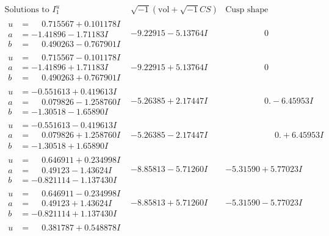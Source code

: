 \documentclass[1p]{elsarticle_modified}
\theoremstyle{definition}
\newcommand{\I}{\sqrt{-1}}
\begin{document}
$$\begin{array}{c|c|c}
\text{Solutions to }I^u_{1}& \I (\text{vol} + \sqrt{-1}CS) & \text{Cusp shape}\\
 \hline 
\begin{aligned}
u &= \phantom{-}0.715567 + 0.101178 I \\
a &= -1.41896 - 1.71183 I \\
b &= \phantom{-}0.490263 - 0.767901 I\end{aligned}
 & -9.22915 - 5.13764 I & \phantom{-0.000000 } 0 \\ \hline\begin{aligned}
u &= \phantom{-}0.715567 - 0.101178 I \\
a &= -1.41896 + 1.71183 I \\
b &= \phantom{-}0.490263 + 0.767901 I\end{aligned}
 & -9.22915 + 5.13764 I & \phantom{-0.000000 } 0 \\ \hline\begin{aligned}
u &= -0.551613 + 0.419613 I \\
a &= \phantom{-}0.079826 - 1.258760 I \\
b &= -1.30518 - 1.65890 I\end{aligned}
 & -5.26385 + 2.17447 I & \phantom{-0.000000 } 0. - 6.45953 I \\ \hline\begin{aligned}
u &= -0.551613 - 0.419613 I \\
a &= \phantom{-}0.079826 + 1.258760 I \\
b &= -1.30518 + 1.65890 I\end{aligned}
 & -5.26385 - 2.17447 I & \phantom{-0.000000 -}0. + 6.45953 I \\ \hline\begin{aligned}
u &= \phantom{-}0.646911 + 0.234998 I \\
a &= \phantom{-}0.49123 - 1.43624 I \\
b &= -0.821114 - 1.137430 I\end{aligned}
 & -8.85813 - 5.71260 I & -5.31590 + 5.77023 I \\ \hline\begin{aligned}
u &= \phantom{-}0.646911 - 0.234998 I \\
a &= \phantom{-}0.49123 + 1.43624 I \\
b &= -0.821114 + 1.137430 I\end{aligned}
 & -8.85813 + 5.71260 I & -5.31590 - 5.77023 I \\ \hline\begin{aligned}
u &= \phantom{-}0.381787 + 0.548878 I \\

\end{aligned}
\end{array}$$
\end{document}
